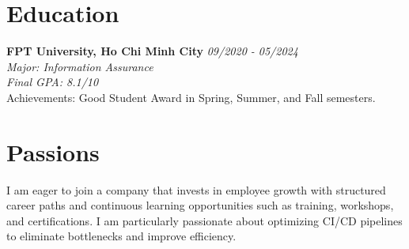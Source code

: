 \documentclass[a4paper,10pt]{article}
\begin{document}
\vspace{10pt}

\section*{Education}
\noindent \textbf{FPT University, Ho Chi Minh City} \hfill \textit{09/2020 - 05/2024} \\
\textit{Major: Information Assurance} \\
\textit{Final GPA: 8.1/10} \\
Achievements: Good Student Award in Spring, Summer, and Fall semesters.

\vspace{5pt}
\section*{Passions}
I am eager to join a company that invests in employee growth with structured career paths and continuous learning opportunities such as training, workshops, and certifications. I am particularly passionate about optimizing CI/CD pipelines to eliminate bottlenecks and improve efficiency.
\end{document}
